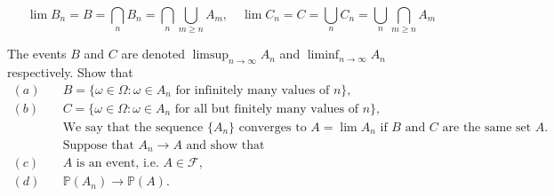 \documentclass[letterpaper, 11pt]{article}
\newcommand{\1}{\mathds{1}}	%
\theoremstyle{definition}
\begin{document}
$$\lim B_{n}=B=\bigcap_{n} B_{n}=\bigcap_{n} \bigcup_{m \geq n} A_{m}, \quad \lim C_{n}=C=\bigcup_{n} C_{n}=\bigcup_{n} \bigcap_{m \geq n} A_{m}$$

The events $B$ and $C$ are denoted $\limsup_{n \rightarrow \infty} A_{n}$ and $\liminf_{n \rightarrow \infty} A_{n}$ respectively. Show that
\begin{align*}
  (a)\quad &B=\{\omega \in \Omega: \omega \in A_{n} \text{ for infinitely many values of }n\},\\
  (b)\quad &C=\{\omega \in \Omega: \omega \in A_{n} \text{ for all but finitely many values of }n\},\\
  &\text{We say that the sequence }\{A_n\} \text{ converges to } A = \lim A_n
  \text{ if } B \text{ and } C \text{ are the same set } A.\\
  &\text{Suppose that } A_n \to A \text{ and show that}\\
  (c)\quad &A \text{ is an event, i.e. } A \in \mathcal{F},\\
  (d)\quad &\mathbb{P}(A_n) \to \mathbb{P}(A).
  \end{align*}
\end{document}
